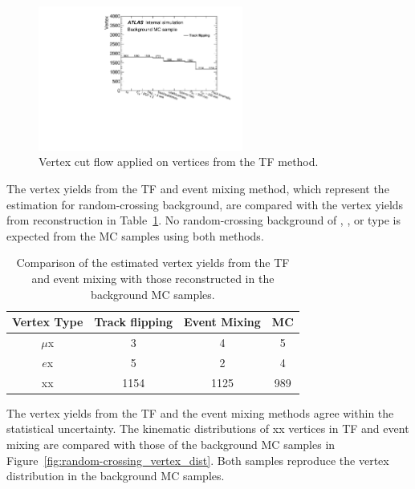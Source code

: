 \begin{figure}[!htb]
	\includegraphics[width=0.60\textwidth]{figures/m_FBE_cutflow_MC.pdf}
	\centering
	\caption{Vertex cut flow applied on \xx vertices from the TF method.}
	\label{fig:m_FBE_cutflow_MC}
\end{figure}

The vertex yields from the TF and event mixing method, which represent the estimation for random-crossing background, are compared with the vertex yields from reconstruction in Table~\ref{table:random_vertex_count}. No random-crossing background of \mumu, \ee, or \emu type is expected from the MC samples using both methods. 
 
\begin{table}[!htb]
  \centering
  \begin{tabular}{ c  c c c }
    \hline
    \hline
	Vertex Type					&Track flipping	    &   Event Mixing 	    & MC                    \\
    \hline
	$\mu$x						&	3			    &	4        			&	5					\\
	$e$x						&	5			    &	2   				&	4					\\
	xx						    &	1154		    &	1125 				&	989 				\\
    \hline
    \hline
  \end{tabular}
  \caption{Comparison of the estimated vertex yields from the TF and event mixing with those reconstructed in the background MC samples.}
  \label{table:random_vertex_count}
\end{table}

The vertex yields from the TF and the event mixing methods agree within the statistical uncertainty. The kinematic distributions of xx vertices in TF and event mixing are compared with those of the background MC samples in Figure~\ref{fig:random-crossing_vertex_dist}. Both samples reproduce the vertex distribution in the background MC samples.

